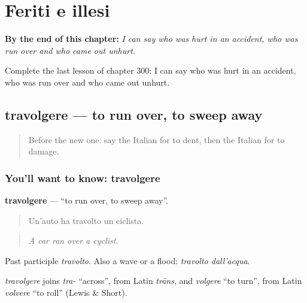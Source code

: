 
\chapter{Feriti e illesi}
\label{ch:it-feriti-e-illesi}

\begin{chapteropening}
\textbf{By the end of this chapter:} \emph{I can say who was hurt in an accident, who was run over and who came out unhurt.}

Complete the last lesson of chapter 300: I can say who was hurt in an accident, who was run over and who came out unhurt.
\end{chapteropening}

\section[travolgere]{travolgere — to run over, to sweep away}

\label{lesson:IT-C300-travolgere}



\begin{quote}
Before the new one: say the Italian for to dent, then the Italian for to damage.
\end{quote}

\subsection*{You'll want to know: travolgere}
\textbf{travolgere} — \textquotedblleft{}to run over, to sweep away\textquotedblright{}.

\begin{quote}
Un'auto ha travolto un ciclista.
\end{quote}

\begin{quote}
\emph{A car ran over a cyclist.}
\end{quote}

Past participle \emph{travolto}. Also a wave or a flood: \emph{travolto dall'acqua}.

\begin{cousinweb}
\emph{travolgere} joins \emph{tra-} \textquotedblleft{}across\textquotedblright{}, from Latin \emph{trāns}, and \emph{volgere} \textquotedblleft{}to turn\textquotedblright{}, from Latin \emph{volvere} \textquotedblleft{}to roll\textquotedblright{} (Lewis \& Short).
\end{cousinweb}

